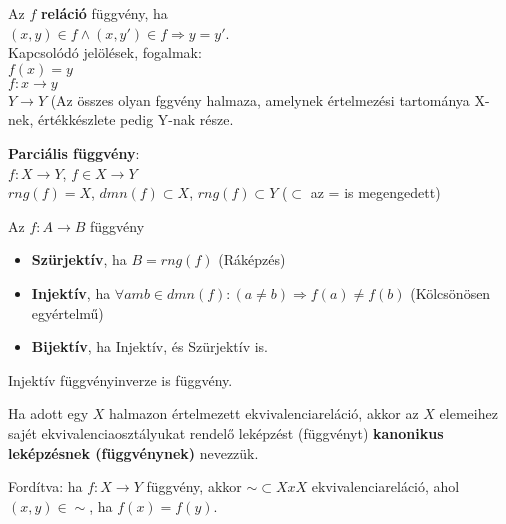\begin{frame}
\begin{tcolorbox}[title={Def.: Függvény, Parciális függvény}]
Az $f$ \textbf{reláció} függvény, ha\\
$(x, y) \in f \land (x, y') \in f \Rightarrow y = y'$.\\
\tcblower
Kapcsolódó jelölések, fogalmak:\\
$f(x) = y$\\
$f : x \rightarrow y$\\
$Y \rightarrow Y$ (Az összes olyan fggvény halmaza, amelynek értelmezési tartománya X-nek, értékkészlete pedig Y-nak része.\\
\mmedskip

\textbf{Parciális függvény}:\\
$f: X \rightarrow Y$, $f \in X \rightarrow Y$\\
$rng(f) = X$, $dmn(f) \subset X$, $rng(f) \subset Y$ ($\subset$ az = is megengedett)
\end{tcolorbox}

\end{frame}

\begin{frame}

\begin{tcolorbox}[title={Def.: Függvények típusai}]
Az $f: A \rightarrow B$ függvény\\
\begin{itemize}
\item \textbf{Szürjektív}, ha $B = rng(f)$ (Ráképzés)
\item \textbf{Injektív}, ha ${\forall} am b \in dmn(f) : (a \neq b) \Rightarrow f(a) \neq f(b)$ (Kölcsönösen egyértelmű)
\item \textbf{Bijektív}, ha Injektív, és Szürjektív is.
\end{itemize}
\end{tcolorbox}

\begin{tcolorbox}[title={Ész}]
Injektív függvényinverze is függvény.
\end{tcolorbox}

\begin{tcolorbox}[title={Def.: Kanonikus leképzés}]
Ha adott egy $X$ halmazon értelmezett ekvivalenciareláció, akkor az $X$ elemeihez sajét ekvivalenciaosztályukat rendelő leképzést (függvényt) \textbf{kanonikus leképzésnek (függvénynek)} nevezzük.

Fordítva: ha $f: X \rightarrow Y$ függvény, akkor $\sim \subset X x X$ ekvivalenciareláció, ahol $(x, y) \in {\sim}$, ha $f(x) = f(y)$.
\end{tcolorbox}
\end{frame}


